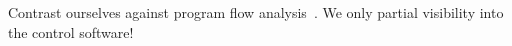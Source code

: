 Contrast ourselves against program flow
analysis~\cite{zhang2006dynamic,tallam2007enabling,Lee:2011:TGR:1993498.1993528,huang2012lean}.
We only partial visibility into the control software!
